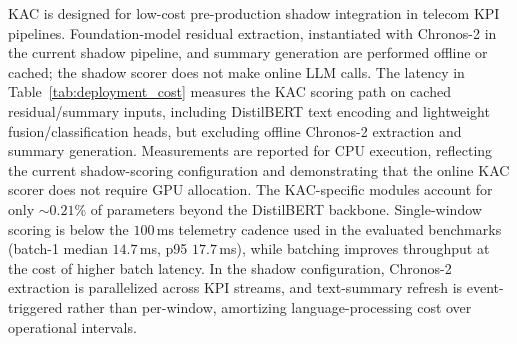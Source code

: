 \documentclass[conference]{IEEEtran}
\begin{document}
KAC is designed for low-cost pre-production shadow integration in telecom KPI pipelines. Foundation-model residual extraction, instantiated with Chronos-2 in the current shadow pipeline, and summary generation are performed offline or cached; the shadow scorer does not make online LLM calls. The latency in Table~\ref{tab:deployment_cost} measures the KAC scoring path on cached residual/summary inputs, including DistilBERT text encoding and lightweight fusion/classification heads, but excluding offline Chronos-2 extraction and summary generation. Measurements are reported for CPU execution, reflecting the current shadow-scoring configuration and demonstrating that the online KAC scorer does not require GPU allocation. The KAC-specific modules account for only $\sim$$0.21\%$ of parameters beyond the DistilBERT backbone. Single-window scoring is below the $100$\,ms telemetry cadence used in the evaluated benchmarks (batch-1 median $14.7$\,ms, p95 $17.7$\,ms), while batching improves throughput at the cost of higher batch latency. In the shadow configuration, Chronos-2 extraction is parallelized across KPI streams, and text-summary refresh is event-triggered rather than per-window, amortizing language-processing cost over operational intervals.
\end{document}
